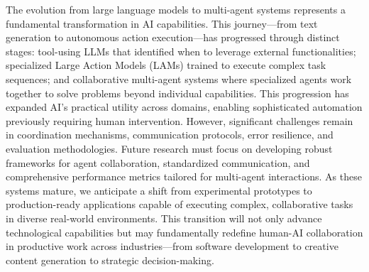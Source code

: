 \documentclass[journal,twoside,10pt]{IEEEtran}
\begin{document}
The evolution from large language models to multi-agent systems represents a fundamental transformation in AI capabilities. This journey—from text generation to autonomous action execution—has progressed through distinct stages: tool-using LLMs that identified when to leverage external functionalities; specialized Large Action Models (LAMs) trained to execute complex task sequences; and collaborative multi-agent systems where specialized agents work together to solve problems beyond individual capabilities.
This progression has expanded AI's practical utility across domains, enabling sophisticated automation previously requiring human intervention. However, significant challenges remain in coordination mechanisms, communication protocols, error resilience, and evaluation methodologies. Future research must focus on developing robust frameworks for agent collaboration, standardized communication, and comprehensive performance metrics tailored for multi-agent interactions.
As these systems mature, we anticipate a shift from experimental prototypes to production-ready applications capable of executing complex, collaborative tasks in diverse real-world environments. This transition will not only advance technological capabilities but may fundamentally redefine human-AI collaboration in productive work across industries—from software development to creative content generation to strategic decision-making.



 
\end{document}
